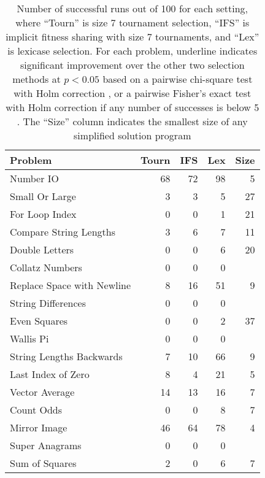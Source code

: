 \documentclass{sig-alternate}
\begin{document}
\begin{table}[t]
\centering
\caption{Number of successful runs out of 100 for each setting, where ``Tourn'' is size 7 tournament selection, ``IFS'' is implicit fitness sharing with size 7 tournaments, and ``Lex'' is lexicase selection. For each problem, underline indicates significant improvement over the other two selection methods at $p < 0.05$ based on a pairwise chi-square test with Holm correction \cite{R}, or a pairwise Fisher's exact test with Holm correction if any number of successes is below 5 \cite{fmsb}. The ``Size'' column indicates the smallest size of any simplified solution program}
\label{tableResults}
\begin{tabular}{lrrr|r}
\toprule
Problem                    & Tourn & IFS & Lex & Size \\
\midrule
Number IO                  & 68      & 72  & 98       & 5    \\
Small Or Large             & 3       & 3   & 5        & 27   \\
For Loop Index             & 0       & 0   & 1        & 21   \\
Compare String Lengths     & 3       & 6   & 7        & 11   \\
Double Letters             & 0       & 0   & 6        & 20   \\
Collatz Numbers            & 0       & 0   & 0        &     \\
Replace Space with Newline & 8       & 16  & 51       & 9    \\
String Differences         & 0       & 0   & 0        &     \\
Even Squares               & 0       & 0   & 2        & 37   \\
Wallis Pi                  & 0       & 0   & 0        &     \\
String Lengths Backwards   & 7       & 10  & 66       & 9    \\
Last Index of Zero         & 8       & 4   & 21       & 5    \\
Vector Average             & 14      & 13  & 16       & 7    \\
Count Odds                 & 0       & 0   & 8        & 7    \\
Mirror Image               & 46      & 64  & 78       & 4    \\
Super Anagrams             & 0       & 0   & 0        &     \\
Sum of Squares             & 2       & 0   & 6        & 7    \\

\end{tabular}
\end{table}
\end{document}
